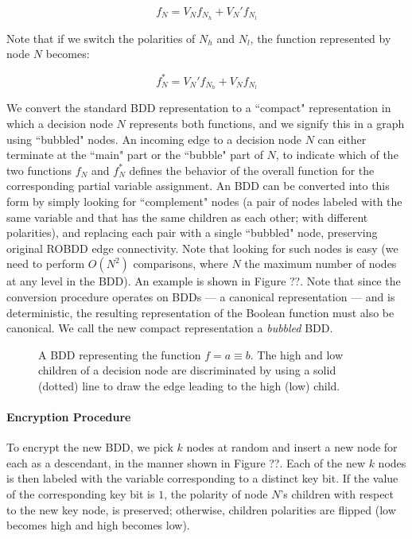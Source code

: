\[f_N=V_N f_{N_h}+V_N' f_{N_l}\]

Note that if we switch the polarities of $N_h$ and $N_l$, the function represented by node $N$ becomes:

\[f_N^*=V_N' f_{N_h}+V_N f_{N_l}\]

We convert the standard BDD representation to a ``compact" representation in which a decision node $N$ represents both functions, and we signify this in a graph using ``bubbled" nodes. An incoming edge to a decision node $N$ can either terminate at the ``main" part or the ``bubble" part of $N$, to indicate which of the two functions $f_N$ and $f_N^*$ defines the behavior of the overall function for the corresponding partial variable assignment. An BDD can be converted into this form by simply looking for ``complement" nodes (a pair of nodes labeled with the same variable and that has the same children as each other; with different polarities), and replacing each pair with a single ``bubbled" node, preserving original ROBDD edge connectivity. Note that looking for such nodes is easy (we need to perform $O(N^2)$ comparisons, where $N$ the maximum number of nodes at any level in the BDD). An example is shown in Figure ??. Note that since the conversion procedure operates on BDDs --- a canonical representation --- and is deterministic, the resulting representation of the Boolean function must also be canonical. We call the new compact representation a \emph{bubbled} BDD.

\begin{lemma}

\end{lemma}

\begin{figure}[h]
  \caption{A BDD representing the function $f = a \equiv b$. The high and low children of a decision node are discriminated by using a solid (dotted) line to draw the edge leading to the high (low) child.}
  \label{fig:dummy}
\end{figure}

\paragraph{Encryption Procedure}  To encrypt the new BDD, we pick $k$ nodes at random and insert a new node for each as a descendant, in the manner shown in Figure ??. Each of the new $k$ nodes is then labeled with the variable corresponding to a distinct key bit. If the value of the corresponding key bit is $1$, the polarity of node $N$'s children with respect to the new key node, is preserved; otherwise, children polarities are flipped (low becomes high and high becomes low). %

